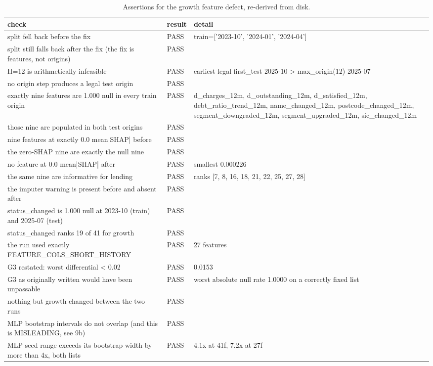 \begin{table}
\caption{Assertions for the growth feature defect, re-derived from disk.}
\label{tab:growth_defect_checks}
\begin{tabular}{lll}
\toprule
check & result & detail \\
\midrule
split fell back before the fix & PASS & train=['2023-10', '2024-01', '2024-04'] \\
split still falls back after the fix (the fix is features, not origins) & PASS &  \\
H=12 is arithmetically infeasible & PASS & earliest legal first_test 2025-10 > max_origin(12) 2025-07 \\
no origin step produces a legal test origin & PASS &  \\
exactly nine features are 1.000 null in every train origin & PASS & d_charges_12m, d_outstanding_12m, d_satisfied_12m, debt_ratio_trend_12m, name_changed_12m, postcode_changed_12m, segment_downgraded_12m, segment_upgraded_12m, sic_changed_12m \\
those nine are populated in both test origins & PASS &  \\
nine features at exactly 0.0 mean|SHAP| before & PASS &  \\
the zero-SHAP nine are exactly the null nine & PASS &  \\
no feature at 0.0 mean|SHAP| after & PASS & smallest 0.000226 \\
the same nine are informative for lending & PASS & ranks [7, 8, 16, 18, 21, 22, 25, 27, 28] \\
the imputer warning is present before and absent after & PASS &  \\
status_changed is 1.000 null at 2023-10 (train) and 2025-07 (test) & PASS &  \\
status_changed ranks 19 of 41 for growth & PASS &  \\
the run used exactly FEATURE_COLS_SHORT_HISTORY & PASS & 27 features \\
G3 restated: worst differential < 0.02 & PASS & 0.0153 \\
G3 as originally written would have been unpassable & PASS & worst absolute null rate 1.0000 on a correctly fixed list \\
nothing but growth changed between the two runs & PASS &  \\
MLP bootstrap intervals do not overlap (and this is MISLEADING, see 9b) & PASS &  \\
MLP seed range exceeds its bootstrap width by more than 4x, both lists & PASS & 4.1x at 41f, 7.2x at 27f \\

\end{tabular}
\end{table}
